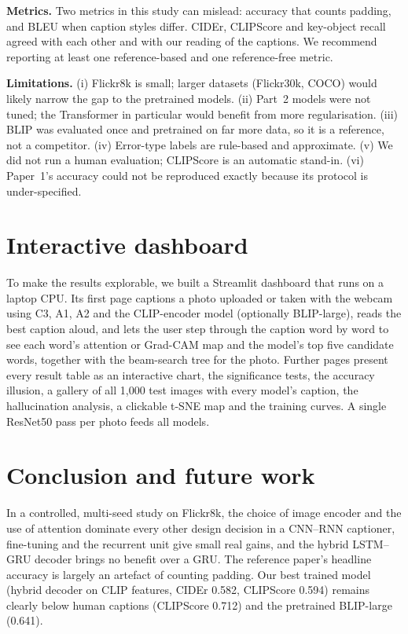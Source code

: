 \documentclass[11pt]{article}
\begin{document}
\textbf{Metrics.} Two metrics in this study can mislead: accuracy that counts padding, and BLEU when caption styles differ. CIDEr, CLIPScore and key-object recall agreed with each other and with our reading of the captions. We recommend reporting at least one reference-based and one reference-free metric.

\textbf{Limitations.} (i) Flickr8k is small; larger datasets (Flickr30k, COCO) would likely narrow the gap to the pretrained models. (ii) Part~2 models were not tuned; the Transformer in particular would benefit from more regularisation. (iii) BLIP was evaluated once and pretrained on far more data, so it is a reference, not a competitor. (iv) Error-type labels are rule-based and approximate. (v) We did not run a human evaluation; CLIPScore is an automatic stand-in. (vi) Paper~1's accuracy could not be reproduced exactly because its protocol is under-specified.

\section{Interactive dashboard}\label{sec:dashboard}

To make the results explorable, we built a Streamlit dashboard that runs on a laptop CPU. Its first page captions a photo uploaded or taken with the webcam using C3, A1, A2 and the CLIP-encoder model (optionally BLIP-large), reads the best caption aloud, and lets the user step through the caption word by word to see each word's attention or Grad-CAM map and the model's top five candidate words, together with the beam-search tree for the photo. Further pages present every result table as an interactive chart, the significance tests, the accuracy illusion, a gallery of all 1,000 test images with every model's caption, the hallucination analysis, a clickable t-SNE map and the training curves. A single ResNet50 pass per photo feeds all models.

\section{Conclusion and future work}\label{sec:conclusion}

In a controlled, multi-seed study on Flickr8k, the choice of image encoder and the use of attention dominate every other design decision in a CNN--RNN captioner, fine-tuning and the recurrent unit give small real gains, and the hybrid LSTM--GRU decoder brings no benefit over a GRU. The reference paper's headline accuracy is largely an artefact of counting padding. Our best trained model (hybrid decoder on CLIP features, CIDEr 0.582, CLIPScore 0.594) remains clearly below human captions (CLIPScore 0.712) and the pretrained BLIP-large (0.641).
\end{document}
